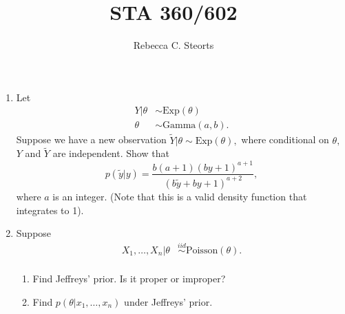 \documentclass[11pt]{article}
\begin{document}
\title{STA 360/602}
\author{Rebecca C. Steorts}
\maketitle
\setlength{\parindent}{0cm}
\thispagestyle{empty}
\begin{enumerate}

\item Let
\begin{align*}
Y|\theta &\sim \text{Exp}(\theta)\\
\theta &\sim \text{Gamma}(a,b).
\end{align*}
Suppose we have a new observation $\tilde{Y}|\theta \sim 
\text{Exp}(\theta),$ where conditional on $\theta,$ $Y$ and 
$\tilde{Y}$ are independent. Show that 
$$p(\tilde{y}|y) = \frac{b(a+1)(by+1)^{a+1}}{(b\tilde{y} + by + 1)^{a+2}},$$ where $a$ is an integer. (Note that this is a valid density function that integrates to 1).

\item Suppose
\begin{align*}
X_1,\ldots,X_n|\theta &\stackrel{iid}{\sim} \text{Poisson}(\theta).\\
\end{align*}
\begin{enumerate}
\item Find Jeffreys' prior. Is it proper or improper? 
\item Find $p(\theta|x_1,\ldots,x_n)$ under Jeffreys' prior.
\end{enumerate}




\end{enumerate}
\end{document}

